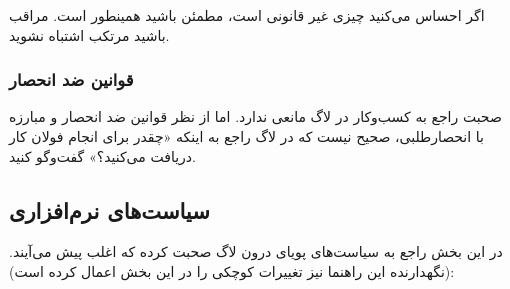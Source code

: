 
اگر احساس می‌کنید چیزی غیر قانونی است، مطمئن باشید همینطور است. مراقب باشید مرتکب اشتباه نشوید.

\subsubsection{قوانین ضد انحصار}
صحبت راجع به کسب‌وکار در لاگ مانعی ندارد. اما از نظر قوانین ضد انحصار و مبارزه با انحصارطلبی، صحیح نیست
که در لاگ راجع به اینکه «چقدر برای انجام فولان کار دریافت می‌کنید؟» گفت‌وگو کنید.

\subsection{سیاست‌های نرم‌افزاری}
در این بخش راجع به سیاست‌های پویای درون لاگ صحبت کرده که اغلب پیش می‌آیند.
(نگهدارنده این راهنما نیز تغییرات کوچکی را در این بخش اعمال کرده است):


